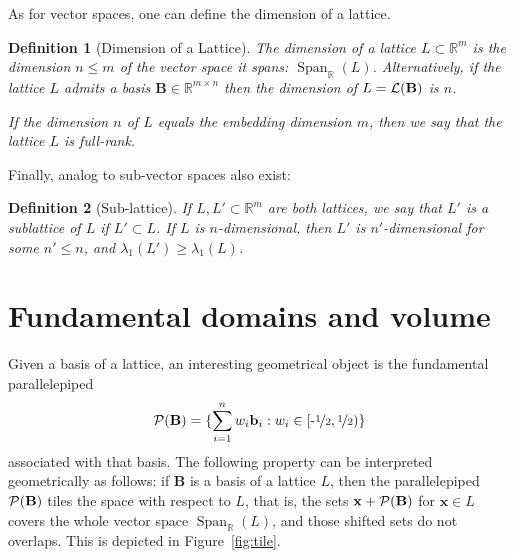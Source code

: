 \documentclass[12pt]{article}
\renewcommand{\vec}{\mathbf}
\newcommand{\R}{\mathbb R}
\newcommand{\Span}{\ensuremath{\operatorname{Span}}}
\newtheorem{definition}{Definition}{\bfseries}{\upshape}
\newcommand{\half}{\ensuremath{\nicefrac 1 2}}
\newcommand{\halfinterval}{\ensuremath{[\mbox{-} \half,\half)}}
\begin{document}
As for vector spaces, one can define the dimension of a lattice.

\begin{definition}[Dimension of a Lattice]
The dimension of a lattice  $L \subset \R^m$ is the dimension $n\leq m$ of the vector space it spans: $\Span_\R(L)$. Alternatively, if the lattice $L$ admits a basis $\vec B \in \R^{m \times n}$ then the dimension of $L = \cL(\vec B)$ is $n$.

If the dimension $n$ of $L$ equals the embedding dimension $m$, then we say that the lattice $L$ is full-rank.
\end{definition}

Finally, analog to sub-vector spaces also exist:
\begin{definition}[Sub-lattice]
If $L,L' \subset \R^m$ are both lattices, we say that $L'$ is a sublattice of $L$ if $L' \subset L$. 
If $L$ is $n$-dimensional, then $L'$ is $n'$-dimensional for some $n' \leq n$, and $\lambda_1(L') \geq \lambda_1(L)$.
\end{definition}

\section{Fundamental domains and volume}
\label{sec:fundamental_domains}

Given a basis of a lattice, an interesting geometrical object is the fundamental parallelepiped \[\cP(\vec B) = \{ \sum_{i=1}^n w_i \vec b_i : w_i \in \halfinterval\}\] associated with that basis.
The following property can be interpreted geometrically as follows: if $\vec B$ is a basis of a lattice $L$,
then the parallelepiped $\cP(\vec B)$ tiles the space with respect to $L$, that is, the sets $\vec x + \cP(\vec B)$
for $\vec x \in L$ covers the whole vector space $\Span_\R(L)$, and those shifted sets do not overlaps. This is depicted in Figure~\ref{fig:tile}.
\end{document}
